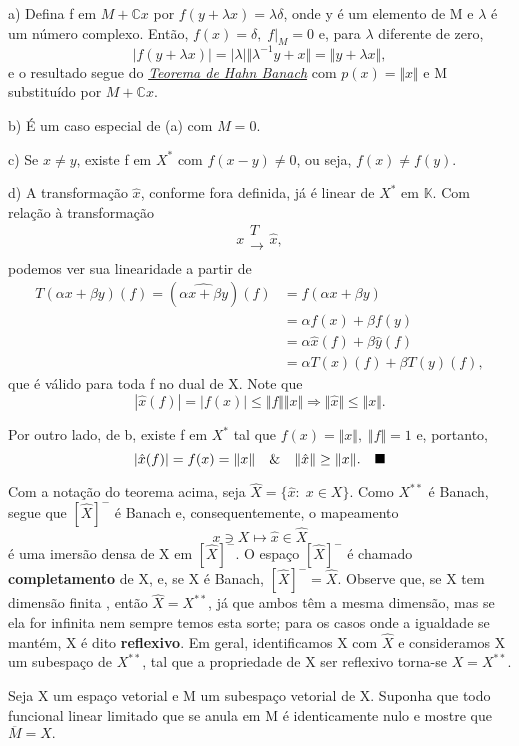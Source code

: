 \documentclass[../functional_analysis.tex]{subfiles}
\begin{document}
\begin{proof*}
	a) Defina f em \(M+\mathbb{C}x\) por \(f(y+\lambda x)=\lambda \delta \), onde y é um elemento de M e \( \lambda \) é um número complexo. Então, \(f(x)=\delta ,\; f|_{M}=0\) e, para \(\lambda \) diferente de zero,
	\[
		|f(y+\lambda x)|=|\lambda |\Vert \lambda^{-1}y + x \Vert=\Vert y+\lambda x \Vert,
	\]
	e o resultado segue do \hyperlink{complex_hahn_banach}{\textit{Teorema de Hahn Banach}} com \(p(x)=\Vert x \Vert\) e M substituído por \(M + \mathbb{C}x\).

	b) É um caso especial de (a) com \(M=0.\)

	c) Se \(x\neq y\), existe f em \(X^{*}\) com \(f(x-y)\neq 0\), ou seja, \(f(x)\neq f(y)\).

	d) A transformação \(\hat{x}\), conforme fora definida, já é linear de \(X^{*}\) em \(\mathbb{K}.\) Com relação à transformação
	\[
		x\substack{T \\ \longrightarrow \\ }\hat{x},
	\]
	podemos ver sua linearidade a partir de
	\begin{align*}
		T(\alpha x+\beta y)(f)=(\widehat{\alpha x+\beta y})(f) & =f(\alpha x+\beta y)                \\
		                                                       & =\alpha f(x)+ \beta f(y)            \\
		                                                       & =\alpha \hat{x}(f)+\beta \hat{y}(f) \\
		                                                       & =\alpha T(x)(f)+\beta T(y)(f),
	\end{align*}
	que é válido para toda f no dual de X. Note que
	\[
		|\hat{x}(f)|=|f(x)|\leq \Vert f \Vert \Vert x \Vert \Rightarrow \Vert \hat{x} \Vert \leq \Vert x \Vert.
	\]

	Por outro lado, de b, existe f em \(X^{*}\) tal que \(f(x)=\Vert x \Vert,\; \Vert f \Vert=1\) e, portanto,
	\[
		|\hat{x}(f)| = f(x) = \Vert x \Vert \quad\&\quad \Vert \hat{x} \Vert\geq \Vert x \Vert.\quad \text{$\blacksquare$}
	\]
\end{proof*}

Com a notação do teorema acima, seja \(\hat{X}=\{\hat{x}:\; x\in X\}.\) Como \(X^{**}\) é Banach, segue que \([\hat{X}]^{-}\) é Banach e, consequentemente, o mapeamento
\[
	x\ni X \mapsto \hat{x}\in \hat{X}
\]
é uma imersão densa de X em \([\hat{X}]^{-}\). O espaço \([\hat{X}]^{-}\) é chamado \textbf{completamento} de X, e, se X é Banach, \([\hat{X}]^{-}=\hat{X}.\) Observe que, se X tem dimensão finita , então \(\hat{X}=X^{**}\), já que ambos têm a mesma dimensão, mas se ela for infinita nem sempre temos esta sorte; para os casos onde a igualdade se mantém, X é dito \textbf{reflexivo}. Em geral, identificamos X com \(\hat{X}\) e consideramos X um subespaço de \(X^{**}\), tal que a propriedade de X ser reflexivo torna-se \(X=X^{**}.\)
\begin{exr}
	Seja X um espaço vetorial e M um subespaço vetorial de X. Suponha que todo funcional linear limitado que se anula em M é identicamente nulo e mostre que \(\overline{M}=X.\)
\end{exr}
\end{document}

